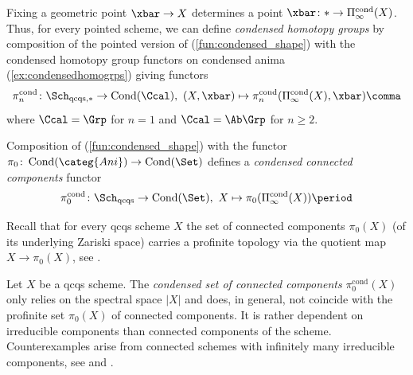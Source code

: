 \documentclass[leqno]{article}
\newcommand{\Ani}{\categ{Ani}}
\DeclareMathOperator{\Cond}{Cond}
\newcommand{\CondAni}{\Cond(\Ani)}
\newcommand{\CondSet}{\Cond(\Set)}
\newcommand{\cond}{\mathrm{cond}}
\newcommand{\Picond}{\Pi_{\infty}^{\cond}}
\newcommand{\CondShape}[1]{\Picond(#1)}
\begin{document}
%
\begin{recollection}
Fixing a geometric point $\xbar\rightarrow X$ determines a point $\xbar\colon \ast\rightarrow \CondShape{X}$. Thus, for every pointed scheme, we can define \textit{condensed homotopy groups} by composition of the pointed version of (\ref{fun:condensed_shape}) with the condensed homotopy group functors on condensed anima (\cref{ex:condensedhomogrps}) giving functors
$$\pi_n^{\cond}\colon \Sch_{\mathrm{qcqs},
\ast}\rightarrow \Cond(\Ccal),\ (X,\xbar) \mapsto \pi_n^{\cond}(\CondShape{X},\xbar)\comma $$
where $\Ccal=\Grp$ for $n=1$ and $\Ccal=\Ab\Grp$ for $n\geq 2$. 
\end{recollection}
%
\begin{recollection}
Composition of (\ref{fun:condensed_shape}) with the functor $\pi_0\colon\CondAni\rightarrow \CondSet$ defines a \textit{condensed connected components} functor
$$\pi_0^{\cond}\colon \Sch_{\mathrm{qcqs}}\rightarrow \CondSet, \ X \mapsto \pi_0(\CondShape{X})\period$$
\end{recollection}
%
%
Recall that for every qcqs scheme $X$ the set of connected components $\pi_0(X)$ (of its underlying Zariski space) carries a profinite topology via the quotient map $X\rightarrow \pi_0(X)$, see .
%
\begin{remark}
Let $X$ be a qcqs scheme. The \textit{condensed set of connected components} $\pi_0^{\cond}(X)$ only relies on the spectral space $|X|$ and does, in general, not coincide with the profinite set $\pi_0(X)$ of connected components. 
It is rather dependent on irreducible components than connected components of the scheme. Counterexamples arise from connected schemes with infinitely many irreducible components, see \cite[Section 4.2]{The_condensed_homotopy_type} and \cite[Example 2.3.33]{CatrinsThesis}.
\end{remark}

%
\end{document}
